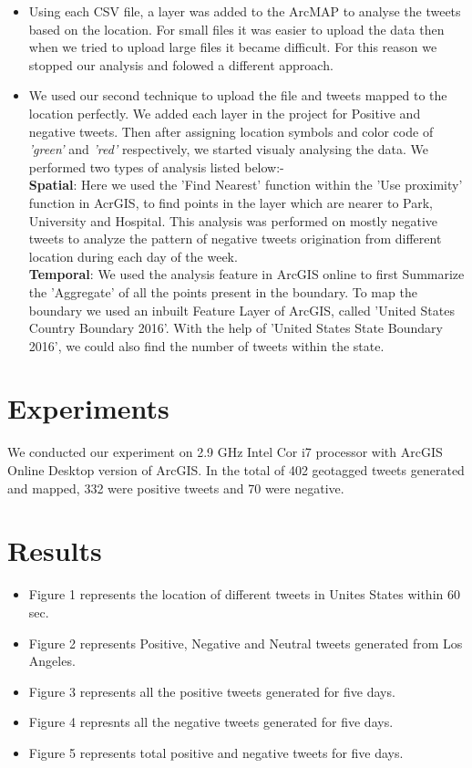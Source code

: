 \documentclass[12pt, oneside]{article}   	%
\begin{document}
\begin{itemize}
	\item Using each CSV file, a layer was added to the ArcMAP to analyse the tweets based on the location. For small files it was easier to upload the data then when we tried to upload large files it became difficult. For this reason we stopped our analysis and folowed a different approach.
	\item We used our second technique to upload the file and tweets mapped to the location perfectly. We added each layer in the project for Positive and negative tweets. Then after assigning location symbols and color code of \emph{'green'} and \emph{'red'} respectively, we started visualy analysing the data. We performed two types of analysis listed below:-\\
	
	\textbf{Spatial}: Here we used the 'Find Nearest' function within the 'Use proximity' function in AcrGIS, to find points in the layer which are nearer to Park, University and Hospital. This analysis was performed on mostly negative tweets to analyze the pattern of negative tweets origination from different location during each day of the week.\\
	
	\textbf{Temporal}: We used the analysis feature in ArcGIS online to first Summarize the 'Aggregate' of all the points present in the boundary. To map the boundary we used an inbuilt Feature Layer of ArcGIS, called 'United States Country Boundary 2016'. With the help of 'United States State Boundary 2016', we could also find the number of tweets within the state. 
\end{itemize}

\section{Experiments}
We conducted our experiment on 2.9 GHz Intel Cor i7 processor with ArcGIS Online Desktop version of  ArcGIS. In the total of  402 geotagged tweets generated and mapped, 332 were positive tweets and 70 were negative. 

\section{Results}

\begin{itemize}
	\item Figure 1 represents the location of different tweets in Unites States within 60 sec.
	\item Figure 2 represents Positive, Negative and Neutral tweets generated from Los Angeles.
	\item Figure 3 represents all the positive tweets generated for five days.
	\item Figure 4 represnts all the negative tweets generated for five days.
	\item Figure 5 represents total positive and negative tweets for five days.
\end{itemize}
\end{document}
